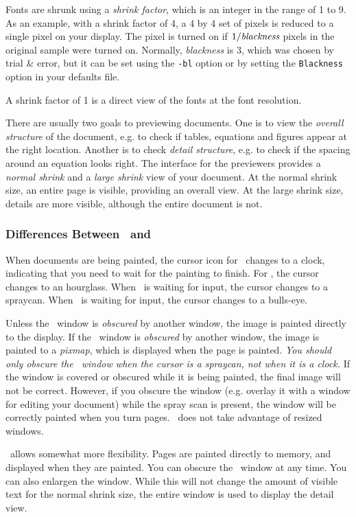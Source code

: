 Fonts are shrunk using a {\em shrink factor},
which is an integer in the range of 1 to 9.
As an example, with a shrink factor of 4, a 4 by 4 set of pixels
is reduced to a single pixel on your display.
The pixel is turned on if $1/\mbox{\em blackness}$ pixels in the
original sample were turned on.
Normally, {\em blackness} is $3$, which was chosen by trial \& error,
but it can be set using the {\tt -bl} option or by setting the
{\tt Blackness} option in your defaults file.

A shrink factor of 1 is a direct view of the fonts at the font resolution.

There are usually two goals to previewing documents.
One is to view the {\em overall structure} of the document, e.g.
to check if tables, equations and figures appear at the right location.
Another is to check {\em detail structure}, e.g. to check
if the spacing around an equation looks right.
The interface for the previewers provides a {\em normal shrink} and a
{\em large shrink} view of your document.
At the normal shrink size, an entire page is visible, providing an
overall view.
At the large shrink size, details are more visible, although the entire
document is not.

\subsubsection{Differences Between \texx\ and \texsun}
When documents are being painted, the cursor icon for \texx\ changes to a
clock, indicating that you need to wait for the painting to finish.
For \texsun, the cursor changes to an hourglass.
When \texx\ is waiting for input, the cursor changes to a spraycan.
When \texsun\ is waiting for input, the cursor changes to a bulls-eye.

Unless the \texx\ window is {\em obscured} by another window,
the image is painted directly to the display.
If the \texx\ window is {\em obscured} by another window,
the image is painted to a {\em pixmap}, which is displayed when the
page is painted.
{\em You should only obscure the \texx\ window when the cursor is
a spraycan, not when it is a clock.}
If the window is covered or obscured while it is being painted, the
final image will not be correct.
However, if you obscure the window (e.g. overlay it with a
window for editing your document) while the spray scan is present,
the window will be correctly painted when you turn pages.
\texx\ does not take advantage of resized windows.

\texsun\ allows somewhat more flexibility.
Pages are painted directly to memory, and displayed when they are painted.
You can obscure the \texsun\ window at any time.
You can also enlargen the window.
While this will not change the amount of visible text for the
normal shrink size, the entire window is used to display the
detail view.

